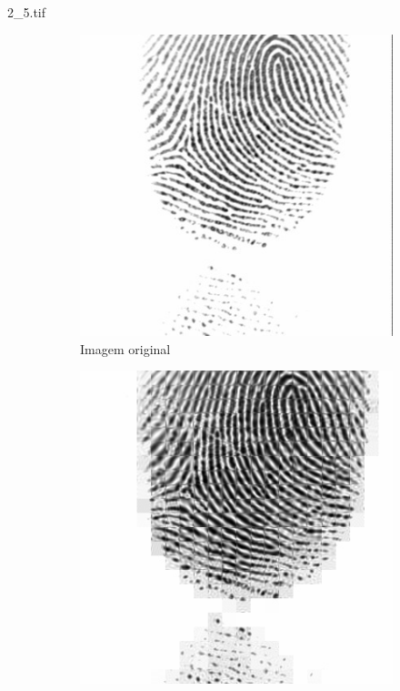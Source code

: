 \documentclass{beamer}
\begin{document}
    \begin{frame}{2\_5.tif}
        \begin{figure}
            \centering
            \begin{subfigure}[!ht]{0.32\textwidth}
                \includegraphics[width=\columnwidth]{Fingerprints/2_5.jpg}
                \caption{Imagem original}
            \end{subfigure}
            \begin{subfigure}[!ht]{0.32\textwidth}
                \includegraphics[width=\columnwidth]{Fingerprints/2_5_intermediate.jpg}

\end{subfigure}
\end{figure}
\end{frame}
\end{document}
